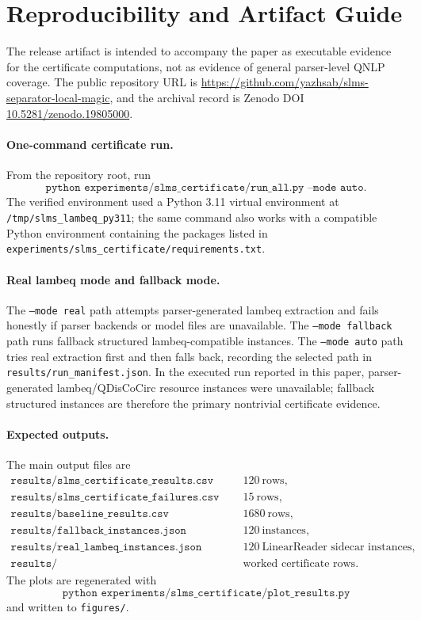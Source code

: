 \section{Reproducibility and Artifact Guide}
\label{app:reproducibility-artifact}

The release artifact is intended to accompany the paper as executable evidence for the certificate computations, not as evidence of general parser-level QNLP coverage. The public repository URL is \url{https://github.com/yazhsab/slms-separator-local-magic}, and the archival record is Zenodo DOI \href{https://doi.org/10.5281/zenodo.19805000}{10.5281/zenodo.19805000}.

\paragraph{One-command certificate run.}
From the repository root, run
\[
\texttt{python experiments/slms\_certificate/run\_all.py --mode auto}.
\]
The verified environment used a Python 3.11 virtual environment at \texttt{/tmp/slms\_lambeq\_py311}; the same command also works with a compatible Python environment containing the packages listed in \texttt{experiments/slms\_certificate/requirements.txt}.

\paragraph{Real lambeq mode and fallback mode.}
The \texttt{--mode real} path attempts parser-generated lambeq extraction and fails honestly if parser backends or model files are unavailable. The \texttt{--mode fallback} path runs fallback structured lambeq-compatible instances. The \texttt{--mode auto} path tries real extraction first and then falls back, recording the selected path in \texttt{results/run\_manifest.json}. In the executed run reported in this paper, parser-generated lambeq/QDisCoCirc resource instances were unavailable; fallback structured instances are therefore the primary nontrivial certificate evidence.

\paragraph{Expected outputs.}
The main output files are
\[
\begin{array}{ll}
\texttt{results/slms\_certificate\_results.csv} & 120\ \text{rows},\\
\texttt{results/slms\_certificate\_failures.csv} & 15\ \text{rows},\\
\texttt{results/baseline\_results.csv} & 1680\ \text{rows},\\
\texttt{results/fallback\_instances.json} & 120\ \text{instances},\\
\texttt{results/real\_lambeq\_instances.json} & 120\ \text{LinearReader sidecar instances},\\
\texttt{results/worked\_certificate\_recurrence.csv} & \text{worked certificate rows}.
\end{array}
\]
The plots are regenerated with
\[
\texttt{python experiments/slms\_certificate/plot\_results.py}
\]
and written to \texttt{figures/}.

